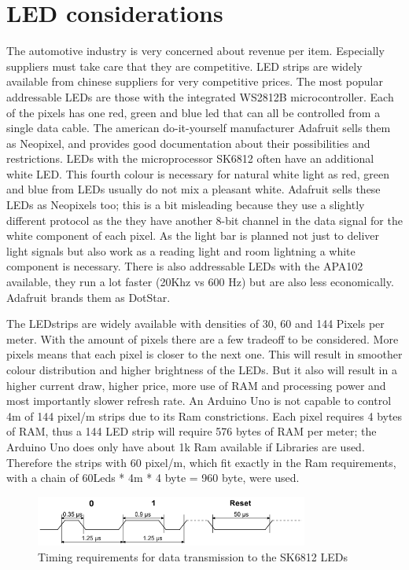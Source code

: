 \section{LED considerations}
\label{LEDconsiderations}
The automotive industry is very concerned about revenue per item. Especially suppliers must take care that they are competitive. LED strips are widely available from chinese suppliers for very competitive prices. The most popular addressable LEDs are those with the integrated WS2812B microcontroller. Each of the pixels has one red, green and blue led that can all be controlled from a single data cable. The american do-it-yourself manufacturer Adafruit sells them as Neopixel, and provides good documentation about their possibilities and restrictions. LEDs with the microprocessor SK6812 often have an additional white LED. This fourth colour is necessary for natural white light as red, green and blue from LEDs usually do not mix a pleasant white. Adafruit sells these LEDs as Neopixels too; this is a bit misleading because they use a slightly different protocol as the they have another 8-bit channel in the data signal for the white component of each pixel. As the light bar is planned not just to deliver light signals but also work as a reading light and room lightning a white component is necessary. There is also addressable LEDs with the APA102 available, they run a lot faster (20Khz vs 600 Hz) but are also less economically. Adafruit brands them as DotStar. 

The LEDstrips are widely available with densities of 30, 60 and 144 Pixels per meter.
With the amount of pixels there are a few tradeoff to be considered. More pixels means that each pixel is closer to the next one. This will result in smoother colour distribution and higher brightness of the LEDs. But it also will result in a higher current draw, higher price, more use of RAM and processing power and most importantly slower refresh rate. An Arduino Uno is not capable to control 4m of 144 pixel/m strips due to its Ram constrictions. Each pixel requires 4 bytes of RAM,  thus a 144 LED strip will require 576 bytes of RAM per meter; the Arduino Uno does only have about 1k Ram available if Libraries are used. Therefore the strips with 60 pixel/m, which fit exactly in the Ram requirements, with a chain of 60Leds * 4m * 4 byte = 960 byte, were used.

\begin{figure}
    \includegraphics[width=0.8\textwidth]{fig/pololu}
    \caption[LED Specification]{Timing requirements for data transmission to the SK6812 LEDs}
    \label{fig:LEDspec}
\end{figure}

